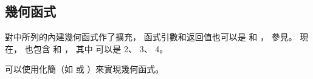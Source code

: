 \subsection[sec:geomtricFunc]{幾何函式}

對中所列的內建幾何函式作了擴充，
函式引數和返回值也可以是  和 ，
參見。
現在，  也包含  和 ，
其中  可以是 2、 3、 4。

\startnotepar
可以使用化簡（如  或 ）來實現幾何函式。
\stopnotepar

{}
